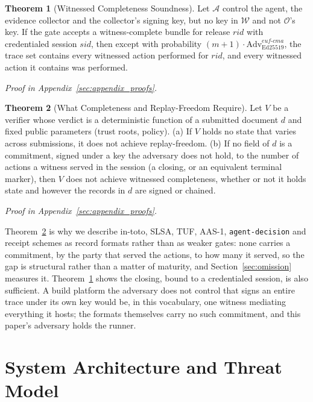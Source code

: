 \documentclass[letterpaper,10pt,twocolumn]{article}
\theoremstyle{definition}
\newtheorem{theorem}{Theorem}
\begin{document}
\begin{theorem}[Witnessed Completeness Soundness]\label{thm:wtc}
Let $\mathcal{A}$ control the agent, the evidence collector and the collector's signing key, but no key in $\mathcal{W}$ and not $\mathcal{O}$'s key. If the gate accepts a witness-complete bundle for release $\mathit{rid}$ with credentialed session $\mathit{sid}$, then except with probability $(m+1) \cdot \mathrm{Adv}^{euf\text{-}cma}_{\mathrm{Ed25519}}$, the trace set contains every witnessed action performed for $\mathit{rid}$, and every witnessed action it contains was performed.
\end{theorem}

\noindent\emph{Proof in Appendix~\ref{sec:appendix_proofs}.}

\begin{theorem}[What Completeness and Replay-Freedom Require]\label{thm:separation}
Let $V$ be a verifier whose verdict is a deterministic function of a submitted document $d$ and fixed public parameters (trust roots, policy). (a) If $V$ holds no state that varies across submissions, it does not achieve replay-freedom. (b) If no field of $d$ is a commitment, signed under a key the adversary does not hold, to the number of actions a witness served in the session (a closing, or an equivalent terminal marker), then $V$ does not achieve witnessed completeness, whether or not it holds state and however the records in $d$ are signed or chained.
\end{theorem}

\noindent\emph{Proof in Appendix~\ref{sec:appendix_proofs}.}

Theorem~\ref{thm:separation} is why we describe in-toto, SLSA, TUF, AAS-1, \texttt{agent-decision} and receipt schemes as record formats rather than as weaker gates: none carries a commitment, by the party that served the actions, to how many it served, so the gap is structural rather than a matter of maturity, and Section~\ref{sec:omission} measures it. Theorem~\ref{thm:wtc} shows the closing, bound to a credentialed session, is also sufficient. A build platform the adversary does not control that signs an entire trace under its own key would be, in this vocabulary, one witness mediating everything it hosts; the formats themselves carry no such commitment, and this paper's adversary holds the runner.

\section{System Architecture and Threat Model}\label{sec:system_threat}
\end{document}
